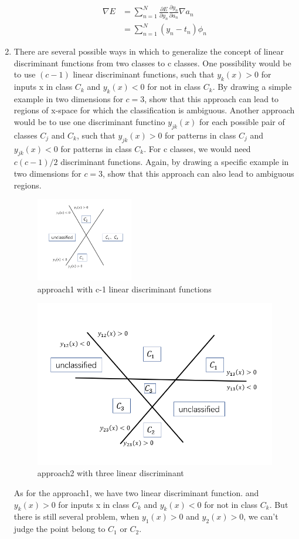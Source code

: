 \documentclass[a4paper]{article}
\begin{document}
\begin{enumerate}
\begin{solution}
\begin{equation*}
			\begin{aligned}
				\nabla E &= \sum_{n = 1}^{N} \frac{\partial E}{\partial y_n}\frac{\partial y_n}{\partial a_n}\nabla a_n\\
				&= \sum_{n = 1}^{N}(y_n - t_n) \phi_n
			\end{aligned}
			\end{equation*}
		\end{solution}
		\item
		There are several possible ways in which to generalize the concept of linear discriminant functions from two classes to c classes. One possibility would be to use $(c-1)$ linear discriminant functions, such that $y_k(x)>0$ for inputs x in class $C_k$ and $y_k(x) < 0$ for not in class $C_k$. By drawing a simple example in two dimensions for $c=3$, show that this approach can lead to regions of x-space for which the classification is ambiguous. Another approach would be to use one discriminant functino $y_{jk}(x)$ for each possible pair of classes $C_j$ and $C_k$, such that $y_{jk}(x) >0$ for patterns in class $C_j$ and $y_{jk}(x) <0$ for patterns in class $C_k$. For c classes, we would need $c(c-1)/2$ discriminant functions. Again, by drawing a specific example in two dimensions for $c=3$, show that this approach can also lead to ambiguous regions.
		\begin{solution}
			
			\begin{figure}[htbp]
				\centering
				\includegraphics[width = 0.4\textwidth]{pic1.png}
				\caption{approach1 with c-1 linear discriminant functions}
				\label{fig:1}
			\end{figure}
			\begin{figure}[htbp]
				\centering
				\includegraphics[width=0.4\linewidth]{pic2.png}
				\caption{approach2 with three linear discriminant}
			\end{figure}
		As for the approach1, we have two linear discriminant function. and $y_k(x)>0$ for inputs x in class $C_k$ and $y_k(x) < 0$ for not in class $C_k$. But there is still several problem, when $y_1(x)>0$ and $y_2(x)>0$, we can't judge the point belong to $C_1$ or $ C_2 $.
		

\end{solution}
\end{enumerate}
\end{document}
